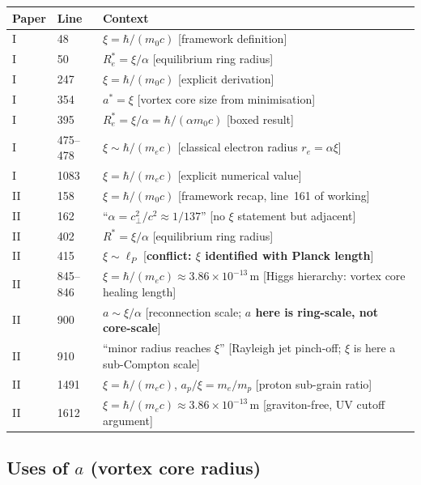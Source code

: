 \documentclass[11pt,a4paper]{article}
\begin{document}
\begin{longtable}{@{}llp{9cm}@{}}
\toprule
Paper & Line & Context \\
\midrule
\endhead
I  & 48   & $\xi = \hbar/(m_0 c)$ [framework definition] \\
I  & 50   & $R_e^* = \xi/\alpha$ [equilibrium ring radius] \\
I  & 247  & $\xi = \hbar/(m_0 c)$ [explicit derivation] \\
I  & 354  & $a^* = \xi$ [vortex core size from minimisation] \\
I  & 395  & $R_e^* = \xi/\alpha = \hbar/(\alpha m_0 c)$ [boxed result] \\
I  & 475--478 & $\xi \sim \hbar/(m_e c)$ [classical electron radius
                $r_e = \alpha\xi$] \\
I  & 1083 & $\xi = \hbar/(m_e c)$ [explicit numerical value] \\
\midrule
II & 158  & $\xi = \hbar/(m_0 c)$ [framework recap, line~161 of working] \\
II & 162  & ``$\alpha = c_\perp^2/c^2 \approx 1/137$'' [no $\xi$ statement
            but adjacent] \\
II & 402  & $R^* = \xi/\alpha$ [equilibrium ring radius] \\
II & 415  & $\xi \sim \ell_P$ [\textbf{conflict: $\xi$ identified with
            Planck length}] \\
II & 845--846 & $\xi = \hbar/(m_e c) \approx 3.86\times 10^{-13}\,\mathrm{m}$
                [Higgs hierarchy: vortex core healing length] \\
II & 900  & $a \sim \xi/\alpha$ [reconnection scale; \textbf{$a$ here is
            ring-scale, not core-scale}] \\
II & 910  & ``minor radius reaches $\xi$'' [Rayleigh jet pinch-off; $\xi$ is
            here a sub-Compton scale] \\
II & 1491 & $\xi = \hbar/(m_e c)$, $a_p/\xi = m_e/m_p$
            [proton sub-grain ratio] \\
II & 1612 & $\xi = \hbar/(m_e c) \approx 3.86\times 10^{-13}\,\mathrm{m}$
            [graviton-free, UV cutoff argument] \\
\bottomrule
\end{longtable}

\subsection{Uses of $a$ (vortex core radius)}
\end{document}
